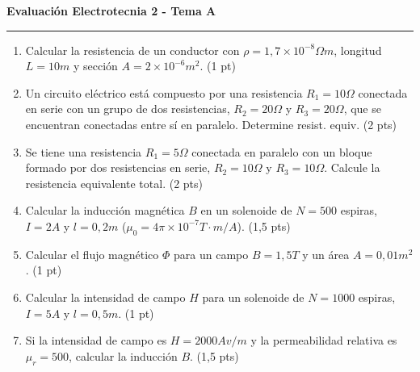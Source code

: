 \documentclass[a4paper,11pt]{article}
\begin{document}
\pagestyle{empty}

\begin{minipage}[t][0.48\textheight][t]{0.48\textwidth}
  \centering \textbf{Evaluación Electrotecnia 2 - Tema A} \\
  \rule{\textwidth}{0.4pt}
  \begin{enumerate}
    \item Calcular la resistencia de un conductor con $\rho=1,7
      \times 10^{-8} \Omega m$, longitud $L=10m$ y sección $A=2
      \times 10^{-6} m^2$. (1 pt)
    \item Un circuito eléctrico está compuesto por una resistencia
      $R_1=10\Omega$ conectada en serie con un grupo de dos
      resistencias, $R_2=20\Omega$ y $R_3=20\Omega$, que se
      encuentran conectadas entre sí en paralelo. Determine resist.
      equiv. (2 pts)
    \item Se tiene una resistencia $R_1=5\Omega$ conectada en
      paralelo con un bloque formado por dos resistencias en serie,
      $R_2=10\Omega$ y $R_3=10\Omega$. Calcule la resistencia
      equivalente total. (2 pts)
    \item Calcular la inducción magnética $B$ en un solenoide de
      $N=500$ espiras, $I=2A$ y $l=0,2m$ ($\mu_0=4\pi \times 10^{-7}
      T\cdot m/A$). (1,5 pts)
    \item Calcular el flujo magnético $\Phi$ para un campo $B=1,5T$ y
      un área $A=0,01m^2$. (1 pt)
    \item Calcular la intensidad de campo $H$ para un solenoide de
      $N=1000$ espiras, $I=5A$ y $l=0,5m$. (1 pt)
    \item Si la intensidad de campo es $H=2000 Av/m$ y la
      permeabilidad relativa es $\mu_r=500$, calcular la inducción
      $B$. (1,5 pts)
  \end{enumerate}
\end{minipage}
\hfill
\end{document}
